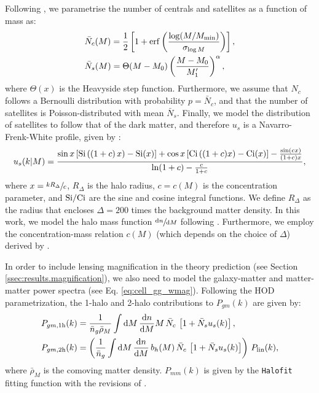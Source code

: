 \documentclass[a4paper,11pt]{article}
\begin{document}
    Following \cite{2011ApJ...736...59Z}, we parametrise the number of centrals and satellites as a function of mass as:
    \begin{align}
      &\bar{N}_c(M)=\frac{1}{2}\left[1+{\rm erf}\left(\frac{\log(M/M_{\rm min})}{\sigma_{\log M}}\right)\right],\\
      &\bar{N}_s(M)=\Theta(M-M_0)\left(\frac{M-M_0}{M_1'}\right)^\alpha,
    \end{align}
    where $\Theta(x)$ is the Heavyside step function. Furthermore, we assume that $N_c$ follows a Bernoulli distribution with probability $p=\bar{N}_c$, and that the number of satellites is Poisson-distributed with mean $\bar{N}_s$. Finally, we model the distribution of satellites to follow that of the dark matter, and therefore $u_s$ is a Navarro-Frenk-White profile, given by \cite{Navarro:1996}:
    \begin{equation}
      u_s(k|M)=\frac{\sin x\left[{\rm Si}\left((1+c)\,x\right)-{\rm Si}(x)\right]+\cos x\left[{\rm Ci}\left((1+c)x\right)-{\rm Ci}(x)\right]-\frac{\sin(cx)}{(1+c)x}}{{\rm ln}(1+c)-\frac{c}{1+c}},
    \end{equation}
    where $x=\sfrac{k R_\Delta}{c}$, $R_\Delta$ is the halo radius, $c=c(M)$ is the concentration parameter, and ${\rm Si}/{\rm Ci}$ are the sine and cosine integral functions. We define $R_\Delta$ as the radius that encloses $\Delta=200$ times the background matter density. In this work, we model the halo mass function $\sfrac{\mathrm{d}n}{\mathrm{d}M}$ following \cite{Tinker:2010}. Furthermore, we employ the concentration-mass relation $c(M)$ (which depends on the choice of $\Delta$) derived by \cite{Duffy:2008}.

    In order to include lensing magnification in the theory prediction (see Section \ref{ssec:results.magnification}), we also need to model the galaxy-matter and matter-matter power spectra (see Eq. \ref{eq:cell_gg_wmag}). Following the HOD parametrization, the 1-halo and 2-halo contributions to $P_{gm}(k)$ are given by:
    \begin{align}
      & P_{gm,{\rm 1h}}(k)=\frac{1}{\bar{n}_g\bar{\rho}_M} \int \mathrm{d}M\,\frac{\mathrm{d}n}{\mathrm{d}M} M\,\bar{N}_c\,\left[1+\bar{N}_su_s(k)\right],\\
      & P_{gm,{\rm 2h}}(k)=\left(\frac{1}{\bar{n}_g} \int \mathrm{d}M\,\frac{\mathrm{d}n}{\mathrm{d}M}\,b_h(M)\,\bar{N}_c\,\left[1+\bar{N}_su_s(k)\right]\right)\,P_{\rm lin}(k),
    \end{align}
    where $\bar{\rho}_M$ is the comoving matter density. $P_{mm}(k)$ is given by the {\tt Halofit} fitting function \cite{Smith:2003} with the revisions of \cite{Takahashi:2012}.
\end{document}
